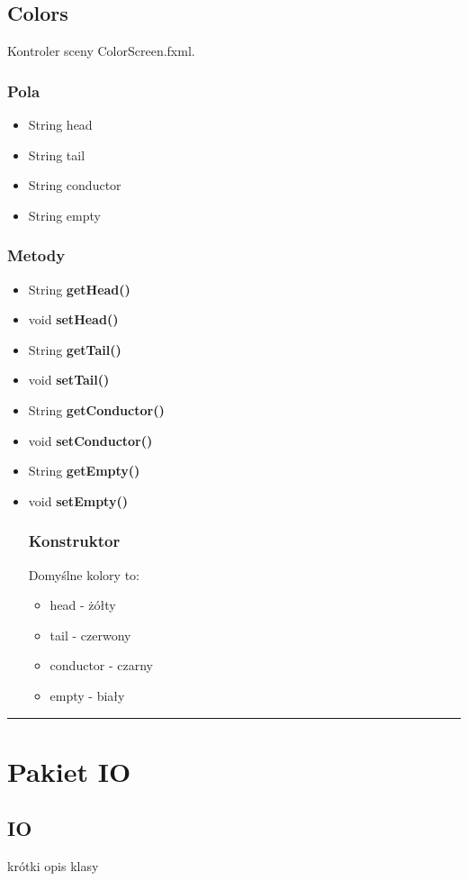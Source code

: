 \documentclass[a4paper,11pt]{article}
\newcommand{\linia}{\rule{\linewidth}{0.4mm}}
\begin{document}
\subsection{Colors}
Kontroler sceny ColorScreen.fxml.
\subsubsection{Pola}
\begin{itemize}
\item String head
\item String tail
\item String conductor
\item String empty

\end{itemize}
\subsubsection{Metody}
\begin{itemize}
\item String \textbf{getHead()}
\item void \textbf{setHead()}
\item String \textbf{getTail()}
\item void \textbf{setTail()}
\item String \textbf{getConductor()}
\item void \textbf{setConductor()}
\item String \textbf{getEmpty()}
\item void \textbf{setEmpty()}
\subsubsection{Konstruktor}
Domyślne kolory to:
\begin{itemize}
\item head - żółty
\item tail - czerwony
\item conductor - czarny
\item empty - biały
\end{itemize}
\end{itemize}
\noindent\linia







\section{Pakiet IO}
\subsection{IO}
krótki opis klasy
\end{document}
